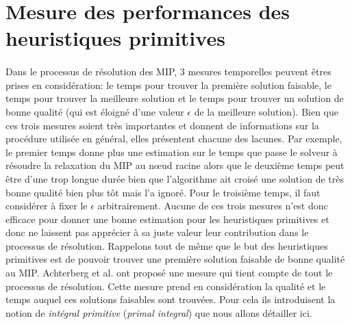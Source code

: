 \documentclass[12pt,a4paper,oneside]{book}
\theoremstyle{definition}
\begin{document}
	
	
	
	\section{Mesure des performances des heuristiques primitives}
	\paragraph{}
	Dans le processus de résolution des MIP, 3 mesures temporelles peuvent êtres prises en considération: le temps pour trouver la première solution faisable, le temps pour trouver la meilleure solution et le temps pour trouver un solution de bonne qualité (qui est éloigné d'une valeur $\epsilon$ de la meilleure solution). Bien que ces trois mesures soient très importantes et donnent de informations sur la procédure utilisée en général, elles présentent chacune des lacunes. Par exemple, le premier temps donne plus une estimation sur le temps que passe le solveur à résoudre la relaxation du MIP au nœud racine alors que le deuxième temps peut être d'une trop longue durée bien que l'algorithme ait croisé une solution de très bonne qualité bien plus tôt mais l'a ignoré. Pour le troisième temps, il faut considérer à fixer le $\epsilon$ arbitrairement. Aucune de ces trois mesures n'est donc efficace pour donner une bonne estimation pour les heuristiques primitives et donc ne laissent pas apprécier à sa juste valeur leur contribution dans le processus de résolution. Rappelons tout de même que le but des heuristiques primitives est de pouvoir trouver une première solution faisable de bonne qualité au MIP. Achterberg et al. \cite{Achterberg2012} ont proposé une mesure qui tient compte de tout le processus de résolution. Cette mesure prend en considération la qualité et le temps auquel ces solutions faisables sont trouvées. Pour cela ils introduisent la notion de \textit{intégral primitive} (\textit{primal integral}) que nous allons détailler ici.
	
\end{document}
